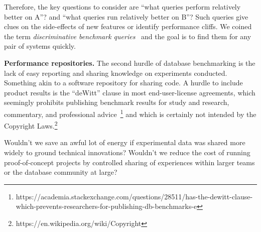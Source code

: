 \documentclass{cidr-2019}
\begin{document}
Therefore, the key questions to consider are ``what queries perform
relatively better on A''? and ``what queries run relatively better on
B''? Such queries give clues on the side-effects of new features or
identify performance cliffs. We coined the term \textit{discriminative
  benchmark queries}~\cite{DBLP:conf/sigmod/KerstenKZ18} and the goal
is to find them for any pair of systems quickly.


{\bf Performance repositories.}  The second hurdle of database
benchmarking is the lack of easy reporting and sharing knowledge on
experiments conducted. Something akin to a software repository for
sharing code. A hurdle to include product results is the ``deWitt''
clause in most end-user-license agreements, which seemingly prohibits
publishing benchmark results for study and research, commentary, and
professional
advice~\footnote{https://academia.stackexchange.com/questions/28511/has-the-dewitt-clause-which-prevents-researchers-for-publishing-db-benchmarks-e}
and which is certainly not intended by the Copyright
Laws.\footnote{https://en.wikipedia.org/wiki/Copyright}

Wouldn't we save an awful lot of energy if experimental data was
shared more widely to ground technical innovations?  Wouldn't we
reduce the cost of running proof-of-concept projects by controlled
sharing of experiences within larger teams or the database community
at large?

\end{document}
